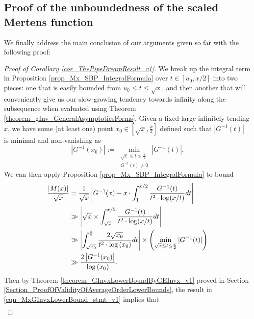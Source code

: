 \documentclass[11pt,reqno,a4letter]{article}
\numberwithin{figure}{section}
\numberwithin{table}{section}
\theoremstyle{plain}
\numberwithin{theorem}{section}
\theoremstyle{definition}
\begin{document}
\subsection{Proof of the unboundedness of the scaled Mertens function}
\label{subSection_TheCoreResultProof} 

We finally address the main conclusion of our arguments given so far with the 
following proof: 

\begin{proof}[Proof of Corollary \ref{cor_ThePipeDreamResult_v1}] 
\label{proofOf_cor_ThePipeDreamResult_v1} 
We break up the integral term in 
Proposition \ref{prop_Mx_SBP_IntegralFormula} 
over $t \in [u_0, x/2]$ into two pieces: one that is easily bounded 
from $u_0 \leq t \leq \sqrt{x}$, 
and then another that will conveniently give us our slow-growing tendency towards 
infinity along the subsequence when evaluated using 
Theorem \ref{theorem_gInv_GeneralAsymptoticsForms}. 
Given a fixed large infinitely tending $x$, we have some (at least one) point 
$x_0 \in \left[\sqrt{x}, \frac{x}{2}\right]$ defined such that 
$|G^{-1}(t)|$ is minimal and non-vanishing as 
\[
\left\lvert G^{-1}(x_0) \right\rvert := 
     \min_{\substack{\sqrt{x} \leq t \leq \frac{x}{2} \\ G^{-1}(t) \neq 0}} |G^{-1}(t)|. 
\]
We can then apply Proposition \ref{prop_Mx_SBP_IntegralFormula} to bound 
\begin{align} 
\notag 
\frac{|M(x)|}{\sqrt{x}} & = 
     \frac{1}{\sqrt{x}} \left\lvert G^{-1}(x) - x \cdot \int_1^{x/2} \frac{G^{-1}(t)}{ 
     t^2 \cdot \log(x/t)} dt \right\rvert \\ 
\notag 
     & \gg 
     \left\lvert \sqrt{x} \times \int_{\sqrt{x}}^{x/2} \frac{G^{-1}(t)}{ 
     t^2 \cdot \log(x/t)} dt \right\rvert \\ 
\notag 
     & \gg \left\lvert \int_{\sqrt{x_0}}^{\frac{x}{2}} \frac{2 \sqrt{x_0}}{ 
     t^2 \cdot \log\left(x_0\right)} dt \right\rvert 
     \times \left( 
     \min_{\sqrt{x} \leq t \leq \frac{x}{2}} |G^{-1}(t)| 
     \right) \\ 
\label{eqn_MxGInvxLowerBound_stmt_v1} 
     & \gg  
     \frac{2 \left\lvert G^{-1}(x_0) \right\rvert}{\log\left(x_0\right)}. 
\end{align} 
Then by Theorem \ref{theorem_GInvxLowerBoundByGEInvx_v1} proved in 
Section \ref{Section_ProofOfValidityOfAverageOrderLowerBounds}, the result in 
\eqref{eqn_MxGInvxLowerBound_stmt_v1} implies that 
\begin{align} 
\label{eqn_MxGInvxLowerBound_stmt_v2} 

\end{align}
\end{proof}
\end{document}
